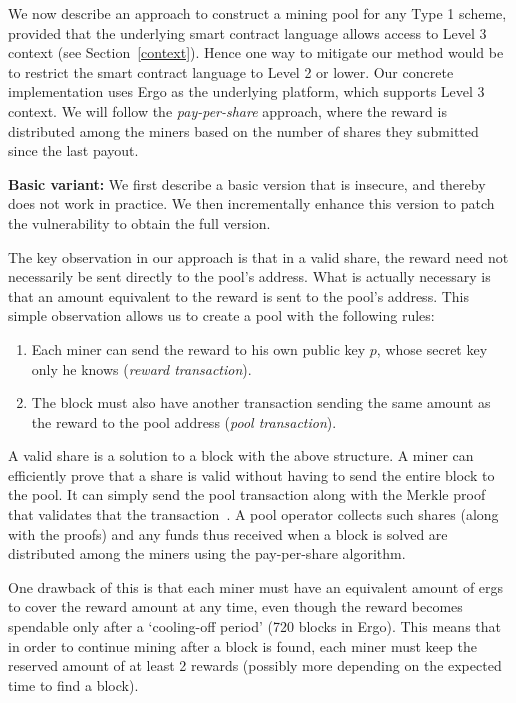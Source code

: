 \documentclass[runningheads]{llncs}
\newcommand{\authnote}[2]{\marginpar{\parbox{\marginparwidth}{\tiny %
  \textsf{#1 {\textcolor{blue}{notes: #2}}}}}%
  \textcolor{blue}{\textbf{\dag}}}
\newcommand{\authnote}[2]{
  \textsf{#1 \textcolor{blue}{: #2}}}
\newcommand{\authnote}[2]{}
\newcommand{\snote}[1]{{\authnote{\textcolor{red}{Scalahub notes}}{#1}}}
\begin{document}
We now describe an approach to construct a mining pool for any Type 1 scheme, provided that the underlying smart contract language allows access to Level 3 context (see Section~\ref{context}). Hence one way to mitigate our method would be to restrict the smart contract language to Level 2 or lower. Our concrete implementation uses Ergo as the underlying platform, which supports Level 3 context. We will follow the {\em pay-per-share} approach, where the reward is distributed among the miners based on the number of shares they submitted since the last payout. 

\textbf{Basic variant:} We first describe a basic version that is  insecure, and thereby does not work in practice. We then incrementally enhance this version to patch the vulnerability to obtain the full version.

The key observation in our approach is that in a valid share, the reward need not necessarily be sent directly to the pool's address. What is actually necessary is that an amount equivalent to the reward is sent to the pool's address. This simple observation allows us to create a pool with the following rules:
\begin{enumerate}
	\item Each miner can send the reward to his own public key $p$, whose secret key only he knows ({\em reward transaction}).
	\item The block must also have another transaction sending the same amount as the reward to the pool address ({\em pool transaction}). 

\end{enumerate}


A valid share is a solution to a block with the above structure. A miner can efficiently prove that a share is valid without having to send the entire block to the pool. It can simply send the pool transaction along with the Merkle proof that validates that the transaction~\cite{Hearn:2012:BIP}.
A pool operator collects such shares (along with the proofs) and any funds thus received when a block is solved are distributed among the miners using the pay-per-share algorithm. 

One drawback of this is that each miner must have an equivalent amount of ergs to cover the reward amount at any time, even though the reward becomes spendable only after a `cooling-off period' (720 blocks in Ergo). 
This means that in order to continue mining after a block is found, each miner must keep the reserved amount of at least 2 rewards (possibly more depending on the expected time to find a block).
\end{document}

